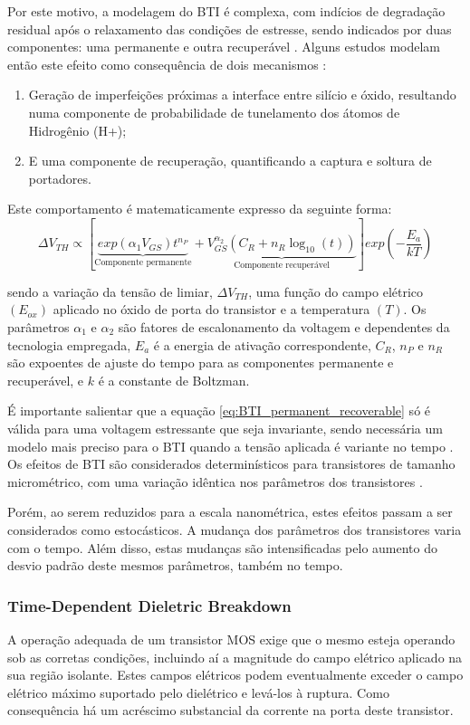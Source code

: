 Por este motivo, a modelagem do BTI \'{e} complexa, com indícios de degradação residual após o relaxamento das condições de estresse, sendo indicados por duas componentes: uma permanente e outra recuperável \cite{Maricau2013}.
Alguns estudos modelam então este efeito como consequência de dois mecanismos \cite{Cho2010}:
\begin{enumerate}
\item
Geração de imperfeições próximas a interface entre silício e óxido, resultando numa componente de probabilidade de tunelamento dos átomos de Hidrogênio (H+);
\item E uma componente de recuperação, quantificando a captura e soltura de portadores.
\end{enumerate}
Este comportamento é matematicamente expresso da seguinte forma:
\begin{equation} \label{eq:BTI_permanent_recoverable}
\Delta V_{TH} \propto \left[ \underbrace{exp(\alpha_1 V_{GS})t^{n_P}}_{\text{Componente permanente}} + \underbrace{V_{GS}^{\alpha_2}(C_R + n_R \log_{10}({t}))}_{\text{Componente recuperável}} \right] exp\left(-\frac{E_a}{kT}\right)
\end{equation}

sendo a variação da tensão de limiar, $\Delta V_{TH}$, uma função do campo elétrico $(E_{ox})$ aplicado no óxido de porta do transistor e a temperatura $(T)$. Os parâmetros $\alpha_1$ e $\alpha_2$ são fatores de escalonamento da voltagem e dependentes da tecnologia empregada, $E_a$ é a energia de ativação correspondente, $C_R$, $n_P$ e $n_R$ são expoentes de ajuste do tempo para as componentes permanente e recuperável, e $k$ é a constante de Boltzman.

É importante salientar que a equação \ref{eq:BTI_permanent_recoverable} só é válida para uma voltagem estressante que seja invariante, sendo necessária um modelo mais preciso para o BTI quando a tensão aplicada é variante no tempo \cite{Grasser2009a}.
Os efeitos de BTI s\~{a}o considerados determin\'{i}sticos para transistores de tamanho microm\'{e}trico, com uma variaç\~{a}o id\^{e}ntica nos par\^{a}metros dos transistores \cite{Wang2007}.

Porém, ao serem reduzidos para a escala nanométrica, estes efeitos passam a ser considerados como estocásticos. A mudança dos parâmetros dos transistores varia com o tempo. Além disso, estas mudanças são intensificadas pelo aumento do desvio padrão deste mesmos parâmetros, também no tempo. 
\subsubsection{Time-Dependent Dieletric Breakdown}
\label{subsection_TDDB}
A operação adequada de um transistor MOS exige que o mesmo esteja operando sob as corretas condições, incluindo aí a magnitude do campo elétrico aplicado na sua região isolante. Estes campos elétricos podem eventualmente exceder o campo elétrico máximo suportado pelo dielétrico e levá-los à ruptura. Como consequência há um acréscimo substancial da corrente na porta deste transistor.

